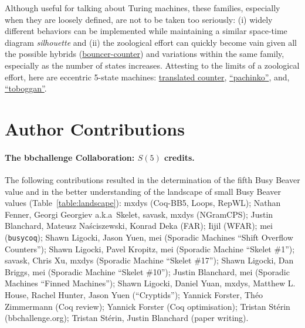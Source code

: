 \documentclass[a4paper,british]{article}
\theoremstyle{definition} %
\numberwithin{equation}{section}
\theoremstyle{definition} %
\newcommand{\CoqBB}{Coq-BB5\xspace}
\begin{document}
Although useful for talking about Turing machines, these families, especially when they are loosely defined, are not to be taken too seriously: (i) widely different behaviors can be implemented while maintaining a similar space-time diagram \textit{silhouette} and (ii) the zoological effort can quickly become vain given all the possible hybrids (\eg \href{https://bbchallenge.org/1RB---_1LC1RE_0RD0LC_1LB1LA_0RA1RE}{bouncer-counter}) and variations within the same family, especially as the number of states increases. Attesting to the limits of a zoological effort, here are eccentric 5-state machines: \href{https://bbchallenge.org/1RB0RA_1LC0LD_1RE1RD_1LA1LB_---1RC}{translated counter}, \href{https://bbchallenge.org/1RB0RD_1LC1LB_1RA0LB_0RE1RD_---1RA}{``pachinko''}, and, \href{https://bbchallenge.org/1RB0RC_0LC---_1RD1RC_0LE1RA_1RD1LE}{``toboggan''}.








\appendix
\newpage
\section{Author Contributions}\label{app:contribs}

\paragraph{The bbchallenge Collaboration: $S(5)$ credits.} The following contributions resulted in the determination of the fifth Busy Beaver value and in the better understanding of the landscape of small Busy Beaver values (Table~\ref{table:landscape}): mxdys (\CoqBB, Loops, RepWL); Nathan Fenner, Georgi Georgiev a.k.a~Skelet, savask, mxdys (NGramCPS); Justin Blanchard, Mateusz Naściszewski, Konrad Deka (FAR); Iijil (WFAR); mei (\texttt{busycoq}); Shawn Ligocki, Jason Yuen, mei (Sporadic Machines ``Shift Overflow Counters''); Shawn Ligocki, Pavel Kropitz, mei (Sporadic Machine ``Skelet \#1''); savask, Chris Xu, mxdys (Sporadic Machine ``Skelet \#17''); Shawn Ligocki, Dan Briggs, mei (Sporadic Machine ``Skelet \#10''); Justin Blanchard, mei (Sporadic Machines ``Finned Machines''); Shawn Ligocki, Daniel Yuan, mxdys, Matthew L. House, Rachel Hunter, Jason Yuen (``Cryptids''); Yannick Forster, Théo Zimmermann (Coq review); Yannick Forster (Coq optimisation); Tristan Stérin (bbchallenge.org); Tristan Stérin, Justin Blanchard (paper writing).
\end{document}
